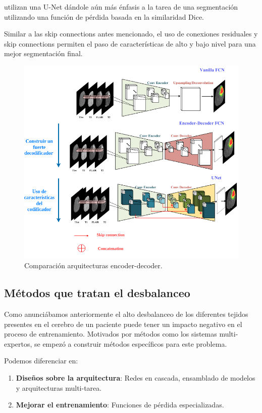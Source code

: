\begin{enumerate}
				\cite{isensee2018brain} utilizan una U-Net dándole aún más énfasis a la tarea de una segmentación utilizando una función de pérdida basada en la similaridad Dice.
				
				Similar a las skip connections antes mencionado, el uso de conexiones residuales  y skip connections permiten el paso de características de alto y bajo nivel para una mejor segmentación final.
				
				\begin{figure}[H]
					\centering
					\includegraphics[width=0.85\linewidth]{imagenes/encoder-decoderIMG.drawio.png}
					\caption{Comparación arquitecturas encoder-decoder. \cite{liu2023deep}}
				\end{figure}
				
			\end{enumerate}
			
			
		\subsection{Métodos que tratan el desbalanceo}
		
		Como anunciábamos anteriormente el alto desbalanceo de los diferentes tejidos presentes en el cerebro de un paciente puede tener un impacto negativo en el proceso de entrenamiento. Motivados por métodos como los sistemas multi-expertos, se empezó a construir métodos específicos para este problema.
		
		Podemos diferenciar en:
		\begin{enumerate}
			\item \textbf{Diseños sobre la arquitectura}: Redes en cascada, ensamblado de modelos y arquitecturas multi-tarea.
			\item \textbf{Mejorar el entrenamiento}: Funciones de pérdida especializadas.
		\end{enumerate}
		
